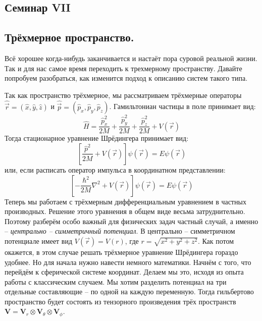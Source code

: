 \begin{center}
    \section{Семинар VII}
\end{center}
\subsection{Трёхмерное пространство.}
Всё хорошее когда-нибудь заканчивается и настаёт пора суровой реальной жизни. Так и для нас самое время переходить к трехмерному пространству. Давайте попробуем разобраться, как изменится подход к описанию систем такого типа.

Так как пространство трёхмерное, мы рассматриваем трёхмерные операторы $\hat{\Vec{r}} = (\hat{x}, \hat{y}, \hat{z})$ и $\hat{\Vec{p}} = (\hat{p}_x, \hat{p}_y, \hat{p}_z)$. Гамильтониан частицы в поле принимает вид:
\[
\hat{H} = \frac{\hat{p}^2_x}{2M} + \frac{\hat{p}^2_y}{2M} + \frac{\hat{p}^2_z}{2M} + V(\Vec{r})
\]
Тогда стационарное уравнение Шрёдингера принимает вид:
\[
\left[\frac{\hat{p}^2}{2M} + V(\Vec{r})\right]\psi(\Vec{r}) = E\psi(\Vec{r})
\]
или, если расписать оператор импульса в координатном представлении:
\[
\left[-\frac{\hbar^2}{2M}\nabla^2 + V(\Vec{r})\right]\psi(\Vec{r}) = E\psi(\Vec{r})
\]
Теперь мы работаем с трёхмерным дифференциальным уравнением в частных производных. Решение этого уравнения в общем виде весьма затруднительно. Поэтому разберём особо важный для физических задач частный случай, а именно -- \textit{центрально -- симметричный потенциал}. В центрально -- симметричном потенциале имеет вид $V(\Vec{r}) = V(r)$, где $r = \sqrt{x^2 + y^2 + z^2}$. Как потом окажется, в этом случае решать трёхмерное уравнение Шрёдингера гораздо удобнее. Но для начала нужно навести немного математики. Начнём с того, что перейдём к сферической системе координат. Делаем мы это, исходя из опыта работы с классическим случаем. Мы хотим разделить потенциал на три отдельные составляющие -- по одной на каждую переменную. Тогда гильбертово пространство будет состоять из тензорного произведения трёх пространств $\mathbf{V} = \mathbf{V}_r\otimes\mathbf{V}_{\theta}\otimes\mathbf{V}_{\phi}$. 

